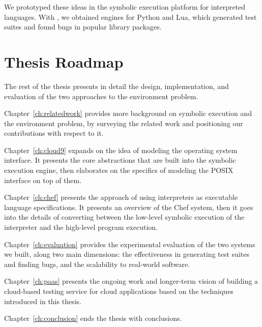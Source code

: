 
We prototyped these ideas in the \chef symbolic execution platform for interpreted languages.  With \chef, we obtained engines for Python and Lua, which generated test suites and found bugs in popular library packages.


\section{Thesis Roadmap}

The rest of the thesis presents in detail the design, implementation, and evaluation of the two approaches to the environment problem.

Chapter~\ref{ch:relatedwork} provides more background on symbolic execution and the environment problem, by surveying the related work and positioning our contributions with respect to it.

Chapter~\ref{ch:cloud9} expands on the idea of modeling the operating system interface.  It presents the core abstractions that are built into the symbolic execution engine, then elaborates on the specifics of modeling the POSIX interface on top of them.

Chapter~\ref{ch:chef} presents the approach of using interpreters as executable language specifications.  It presents an overview of the Chef system, then it goes into the details of converting between the low-level symbolic execution of the interpreter and the high-level program execution.

Chapter~\ref{ch:evaluation} provides the experimental evaluation of the two systems we built, along two main dimensions: the effectiveness in generating test suites and finding bugs, and the scalability to real-world software.

Chapter~\ref{ch:paas} presents the ongoing work and longer-term vision of building a cloud-based testing service for cloud applications based on the techniques introduced in this thesis.

Chapter~\ref{ch:conclusion} ends the thesis with conclusions.










